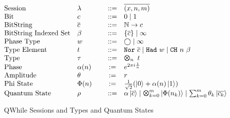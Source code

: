 \begin{figure}[t]
  \small
  \[\hspace*{-0.5em}
\begin{array}{l>{$} p{1.2cm} <{$} c l}
      \text{Session} & \lambda & ::= & \overline{(x,n,m)} \\
      \text{Bit} & c & ::= & 0 \mid 1 \\
      \text{BitString} & \overline{c} & ::= & \mathbb{N} \to c \\
      \text{BitString Indexed Set} & \beta & ::= & \{\overline{c} \} \mid \infty \\
      \text{Phase Type} & w & ::= & \bigcirc \mid \infty \\
      \text{Type Element} & t & ::= & \tnor{\overline{c}} \mid \thad{w} \mid \tch{n}{\beta}\\
      \text{Type} & \tau & ::= & \ttype{n}{t}\\
      \text{Phase} & \alpha(n) & := & e^{2\pi i \frac{1}{n}} \\
      \text{Amplitude} & \theta & := & r \\
      \text{Phi State} & \Phi(n) & := & \frac{1}{\sqrt{2}} (\ket{0}+\alpha(n)\ket{1}) \\
      \text{Quantum State} & \rho & ::= & \alpha\ket{\overline{c}}\mid \Motimes_{k=0}^{m}\ket{\Phi(n_k)}
                                         \mid \sum_{k=0}^{m}\theta_k\ket{\overline{c_k}}
    \end{array}
  \]
  \caption{QWhile Sessions and Types and Quantum States}
  \label{fig:vqir-state}
\end{figure}


